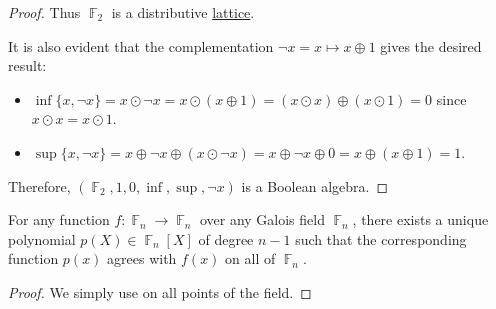 \begin{proof}
  Thus \( \BbbF_2 \) is a distributive \hyperref[def:semilattice/distributive_lattice]{lattice}.

  It is also evident that the complementation \( \neg x = x \mapsto x \oplus 1 \) gives the desired result:
  \begin{itemize}
    \item \( \inf \{ x, \neg x \} = x \odot \neg x = x \odot (x \oplus 1) = (x \odot x) \oplus (x \odot 1) = 0 \) since \( x \odot x = x \odot 1 \).
    \item \( \sup \{ x, \neg x \} = x \oplus \neg x \oplus (x \odot \neg x) = x \oplus \neg x \oplus 0 = x \oplus (x \oplus 1) = 1 \).
  \end{itemize}

  Therefore, \( (\BbbF_2, 1, 0, \inf, \sup, \neg x ) \) is a Boolean algebra.
\end{proof}

\begin{proposition}
  For any function \( f: \BbbF_n \to \BbbF_n \) over any Galois field \( \BbbF_n \), there exists a unique polynomial \( p(X) \in \BbbF_n[X] \) of degree \( n - 1 \) such that the corresponding function \( p(x) \) agrees with \( f(x) \) on all of \( \BbbF_n \).
\end{proposition}
\begin{proof}
  We simply use  on all points of the field.
\end{proof}


